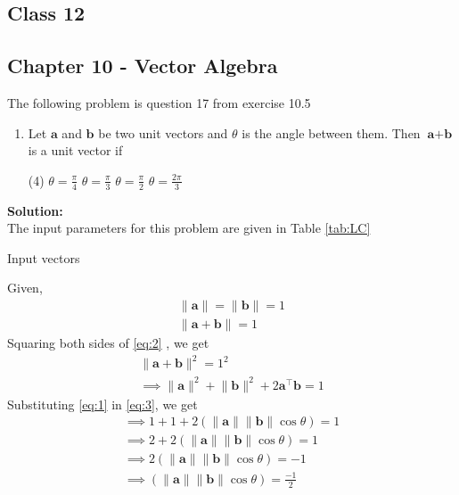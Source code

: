 \documentclass{article}
\newcommand{\norm}[1]{\lVert#1\rVert}
\renewcommand{\vec}[1]{\textbf{#1}}
\begin{document}
\onehalfspacing
\begin{center}
	\section*{\textbf{Class 12}}
	\subsection*{Chapter 10 - Vector Algebra}
\end{center}
The following problem is question 17 from exercise 10.5

\begin{enumerate}
	\item Let $\vec{a}$ and $\vec{b}$ be two unit vectors and $\theta$ is the angle between them. Then $\vec{a}+\vec{b}$ is a unit vector if
		\begin{tasks}(4)
			\task $\theta = \frac{\pi}{4}$
			\task $\theta = \frac{\pi}{3}$
			\task $\theta = \frac{\pi}{2}$
			\task $\theta = \frac{2\pi}{3}$
			\end{tasks}
			
\end{enumerate}
	\textbf{Solution:}
\\
The input parameters for this problem are given in Table \ref{tab:LC}
\begin{table}[ht!]\centering
	
	\caption{Input vectors \label{tab:LC}}
\end{table}
Given,
\begin{align}
	\norm{\vec{a}}=\norm{\vec{b}}=1\label{eq:1}
	\\
	\norm{\vec{a}+\vec{b}}=1\label{eq:2}
\end{align}
Squaring both sides of \eqref{eq:2}  , we get
\begin{align}
	\norm{\vec{a}+\vec{b}}^2=1^2
\\	
	\implies \norm{\vec{a}}^2 + \norm{\vec{b}}^2 + 2\vec{a}^{\top}\vec{b} = 1\label{eq:3}	
\end{align}
Substituting \eqref{eq:1} in \eqref{eq:3}, we get
\\
\begin{align}
	\implies 1+1+2(\norm{\vec{a}}\norm{\vec{b}}\cos{\theta})=1
	\\
	\implies 2+2(\norm{\vec{a}}\norm{\vec{b}}\cos{\theta})=1
        \\
	\implies 2(\norm{\vec{a}}\norm{\vec{b}}\cos{\theta})=-1
	\\
	\implies (\norm{\vec{a}}\norm{\vec{b}}\cos{\theta})=\frac{-1}{2}\label{eq:4}
\end{align}
\end{document}
